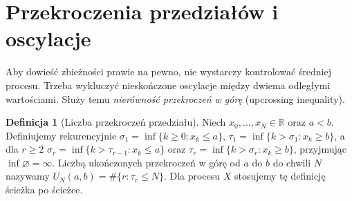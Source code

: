 \documentclass[11pt,a4paper,oneside]{report}
\numberwithin{equation}{chapter}
\theoremstyle{plain}
\theoremstyle{definition}
\newtheorem{definicja}{Definicja}[chapter]
\theoremstyle{remark}
\newcommand{\R}{\mathbb{R}}
\begin{document}
\section{Przekroczenia przedziałów i oscylacje}

Aby dowieść zbieżności prawie na pewno, nie wystarczy
kontrolować średniej procesu. Trzeba wykluczyć
nieskończone oscylacje między dwiema odległymi
wartościami. Służy temu \emph{nierówność
przekroczeń w górę} (upcrossing inequality).

\begin{definicja}[Liczba przekroczeń przedziału]
Niech $x_0,\ldots,x_N\in\R$ oraz $a<b$.
Definiujemy rekurencyjnie
$\sigma_1=\inf\{k\geq0:x_k\leq a\}$,
$\tau_1=\inf\{k>\sigma_1:x_k\geq b\}$,
a dla $r\geq2$
$\sigma_r=\inf\{k>\tau_{r-1}:x_k\leq a\}$
oraz $\tau_r=\inf\{k>\sigma_r:x_k\geq b\}$,
przyjmując $\inf\varnothing=\infty$.
Liczbą ukończonych przekroczeń w górę
od $a$ do $b$ do chwili $N$ nazywamy
$U_N(a,b)=\#\{r:\tau_r\leq N\}$.
Dla procesu $X$ stosujemy tę definicję
ścieżka po ścieżce.
\end{definicja}
\end{document}

